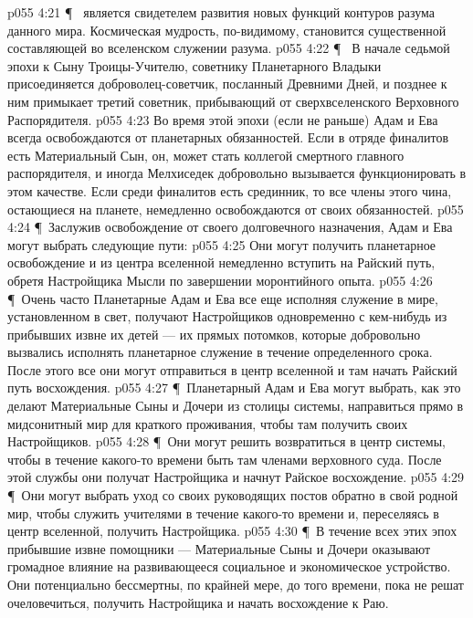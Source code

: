 \vs p055 4:21 \P\ \bibnobreakspace {} является свидетелем развития новых функций контуров разума данного мира. Космическая мудрость, по\hyp{}видимому, становится существенной составляющей во вселенском служении разума.
\vs p055 4:22 \P\ \bibnobreakspace {} В начале седьмой эпохи к Сыну Троицы\hyp{}Учителю, советнику Планетарного Владыки присоединяется доброволец\hyp{}советчик, посланный Древними Дней, и позднее к ним примыкает третий советник, прибывающий от сверхвселенского Верховного Распорядителя.
\vs p055 4:23 Во время этой эпохи (если не раньше) Адам и Ева всегда освобождаются от планетарных обязанностей. Если в отряде финалитов есть Материальный Сын, он, может стать коллегой смертного главного распорядителя, и иногда Мелхиседек добровольно вызывается функционировать в этом качестве. Если среди финалитов есть срединник, то все члены этого чина, остающиеся на планете, немедленно освобождаются от своих обязанностей.
\vs p055 4:24 \P\ Заслужив освобождение от своего долговечного назначения, Адам и Ева могут выбрать следующие пути:
\vs p055 4:25 \bibnobreakspace Они могут получить планетарное освобождение и из центра вселенной немедленно вступить на Райский путь, обретя Настройщика Мысли по завершении моронтийного опыта.
\vs p055 4:26 \P\ \bibnobreakspace Очень часто Планетарные Адам и Ева все еще исполняя служение в мире, установленном в свет, получают Настройщиков одновременно с кем\hyp{}нибудь из прибывших извне их детей --- их прямых потомков, которые добровольно вызвались исполнять планетарное служение в течение определенного срока. После этого все они могут отправиться в центр вселенной и там начать Райский путь восхождения.
\vs p055 4:27 \P\ \bibnobreakspace Планетарный Адам и Ева могут выбрать, как это делают Материальные Сыны и Дочери из столицы системы, направиться прямо в мидсонитный мир для краткого проживания, чтобы там получить своих Настройщиков.
\vs p055 4:28 \P\ \bibnobreakspace Они могут решить возвратиться в центр системы, чтобы в течение какого\hyp{}то времени быть там членами верховного суда. После этой службы они получат Настройщика и начнут Райское восхождение.
\vs p055 4:29 \P\ \bibnobreakspace Они могут выбрать уход со своих руководящих постов обратно в свой родной мир, чтобы служить учителями в течение какого\hyp{}то времени и, переселяясь в центр вселенной, получить Настройщика.
\vs p055 4:30 \P\ В течение всех этих эпох прибывшие извне помощники --- Материальные Сыны и Дочери оказывают громадное влияние на развивающееся социальное и экономическое устройство. Они потенциально бессмертны, по крайней мере, до того времени, пока не решат очеловечиться, получить Настройщика и начать восхождение к Раю.
